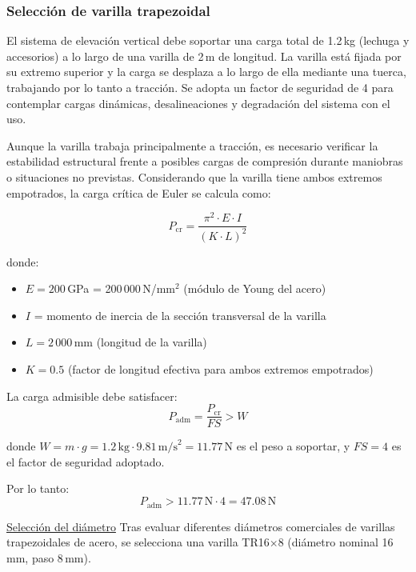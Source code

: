 \subsubsection{Selección de varilla trapezoidal} 
\label{sec:mov_vertical}
El sistema de elevación vertical debe soportar una carga total de 1.2\,kg (lechuga y accesorios) a lo largo de una varilla de 2\,m de longitud. La varilla está fijada por su extremo superior y la carga se desplaza a lo largo de ella mediante una tuerca, trabajando por lo tanto a tracción. Se adopta un factor de seguridad de 4 para contemplar cargas dinámicas, desalineaciones y degradación del sistema con el uso.

Aunque la varilla trabaja principalmente a tracción, es necesario verificar la estabilidad estructural frente a posibles cargas de compresión durante maniobras o situaciones no previstas. Considerando que la varilla tiene ambos extremos empotrados, la carga crítica de Euler se calcula como:

\begin{equation}
P_{\text{cr}} = \frac{\pi^2 \cdot E \cdot I}{(K \cdot L)^2}
\label{eq:euler_pandeo}
\end{equation}

donde:
\begin{itemize}[label=$\bullet$]
    \item $E = 200$\,GPa = 200\,000\,N/mm$^2$ (módulo de Young del acero)
    \item $I$ = momento de inercia de la sección transversal de la varilla
    \item $L = 2\,000$\,mm (longitud de la varilla)
    \item $K = 0.5$ (factor de longitud efectiva para ambos extremos empotrados)
\end{itemize}

La carga admisible debe satisfacer:
\begin{equation}
P_{\text{adm}} = \frac{P_{\text{cr}}}{FS} > W
\end{equation}

donde $W = m \cdot g = 1.2\,\text{kg} \cdot 9.81\,\text{m/s}^2 = 11.77$\,N es el peso a soportar, y $FS = 4$ es el factor de seguridad adoptado.

Por lo tanto:
\[P_{\text{adm}} > 11.77\,\text{N} \cdot 4 = 47.08\,\text{N}\]

\underline{Selección del diámetro}
Tras evaluar diferentes diámetros comerciales de varillas trapezoidales de acero, se selecciona una varilla TR16$\times$8 (diámetro nominal 16\,mm, paso 8\,mm).

